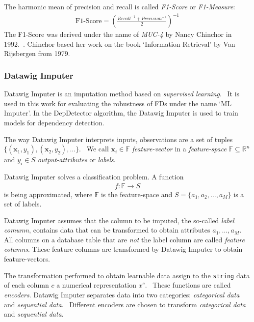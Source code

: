 The harmonic mean of precision and recall is called \emph{F1-Score} or \emph{F1-Measure}:
\begin{align}\label{eq:f1-score}
\text{F1-Score} = {\left(\frac{Recall^{-1} + Precision^{-1}}{2}\right)}^{-1}
\end{align}
The F1-Score was derived under the name of \emph{MUC-4} by Nancy Chinchor in 1992.~\cite{CHI92}.
Chinchor based her work on the book `Information Retrieval' by Van Rijsbergen from 1979.~\cite{RIJ79}

\subsubsection{Datawig Imputer}
Datawig Imputer is an imputation method based on \emph{supervised learning}.~\cite[p.~1]{BIE18}
It is used in this work for evaluating the robustness of FDs under the name `ML Imputer'.
In the DepDetector algorithm, the Datawig Imputer is used to train models for dependency detection.

The way Datawig Imputer interprets inputs, observations are a set of tuples \( \{\left(\mathbold{x}_1, y_1\right),\left(\mathbold{x}_2, y_2\right), \dots \} \).~\cite[p.~10]{SMO08}
We call \( \mathbold{x}_i \in \mathbb{F}\) \emph{feature-vector} in a \emph{feature-space} \( \mathbb{F} \subseteq \mathbb{R}^{n} \) and \( y_i \in S \) \emph{output-attributes} or \emph{labels}.~\cite[p.~7]{DUD00}

Datawig Imputer solves a classification problem.
A function
\begin{align}
    f: \mathbb{F} \rightarrow S
\end{align}
is being approximated, where \( \mathbb{F} \) is the feature-space and \( S = \{a_1, a_2, \dots, a_M \} \) is a set of labels.

Datawig Imputer assumes that the column to be imputed, the so-called \emph{label comumn}, contains data that can be transformed to obtain attributes \( a_1, \dots, a_M \).~\cite[p.~2018]{BIE18}
All columns on a database table that are \emph{not} the label column are called \emph{feature columns}.
These feature columns are transformed by Datawig Imputer to obtain feature-vectors.

The transformation performed to obtain learnable data assign to the \texttt{string} data of each column \( c \) a numerical representation \( x^c \).~\cite[p.~2020]{BIE18}
These functions are called \emph{encoders}.
Datawig Imputer separates data into two categories: \emph{categorical data} and \emph{sequential data}.~\cite[p.~2017]{BIE18}
Different encoders are chosen to transform \emph{categorical data} and \emph{sequential data}.

